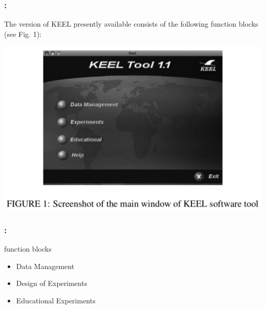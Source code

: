 \documentclass{beamer}
\begin{document}
\begin{CJK*}{UTF8}{bsmi}
\begin{frame}
	\frametitle{\insertsection : \insertsubsection}
	The version of KEEL presently available consists of the following function blocks (see Fig. 1):
\begin{center}
\includegraphics[width=1\linewidth]{./1.png}
\end{center}
\end{frame}


\begin{frame}
	\frametitle{\insertsection : \insertsubsection}
	\begin{block}{function blocks }
	\begin{itemize}
		\item Data Management
		\item Design of Experiments
		\item Educational Experiments
	\end{itemize}
	\end{block}
\end{frame}



\end{CJK*}
\end{document}

